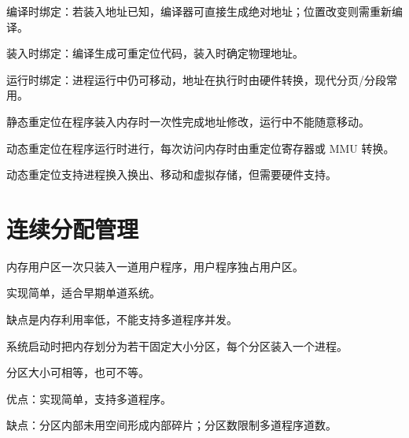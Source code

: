 \begin{points}
  \item 编译时绑定：若装入地址已知，编译器可直接生成绝对地址；位置改变则需重新编译。
  \item 装入时绑定：编译生成可重定位代码，装入时确定物理地址。
  \item 运行时绑定：进程运行中仍可移动，地址在执行时由硬件转换，现代分页/分段常用。
\end{points}


\begin{points}
  \item 静态重定位在程序装入内存时一次性完成地址修改，运行中不能随意移动。
  \item 动态重定位在程序运行时进行，每次访问内存时由重定位寄存器或 MMU 转换。
  \item 动态重定位支持进程换入换出、移动和虚拟存储，但需要硬件支持。
\end{points}


\section{连续分配管理}
\begin{points}
  \item 内存用户区一次只装入一道用户程序，用户程序独占用户区。
  \item 实现简单，适合早期单道系统。
  \item 缺点是内存利用率低，不能支持多道程序并发。
\end{points}


\begin{points}
  \item 系统启动时把内存划分为若干固定大小分区，每个分区装入一个进程。
  \item 分区大小可相等，也可不等。
  \item 优点：实现简单，支持多道程序。
  \item 缺点：分区内部未用空间形成内部碎片；分区数限制多道程序道数。
\end{points}


